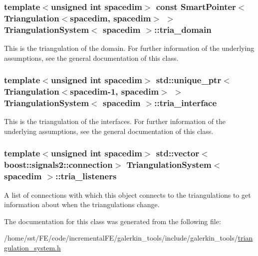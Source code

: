 \subsubsection[{\texorpdfstring{tria\+\_\+domain}{tria_domain}}]{\setlength{\rightskip}{0pt plus 5cm}template$<$unsigned int spacedim$>$ const {\bf Smart\+Pointer}$<${\bf Triangulation}$<$spacedim, spacedim$>$ $>$ {\bf Triangulation\+System}$<$ spacedim $>$\+::tria\+\_\+domain\hspace{0.3cm}{\ttfamily [protected]}}\hypertarget{class_triangulation_system_a68bafddc70652cb7c64701c74e86279f}{}\label{class_triangulation_system_a68bafddc70652cb7c64701c74e86279f}
This is the triangulation of the domain. For further information of the underlying assumptions, see the general documentation of this class. 
\subsubsection[{\texorpdfstring{tria\+\_\+interface}{tria_interface}}]{\setlength{\rightskip}{0pt plus 5cm}template$<$unsigned int spacedim$>$ std\+::unique\+\_\+ptr$<${\bf Triangulation}$<$spacedim-\/1, spacedim$>$ $>$ {\bf Triangulation\+System}$<$ spacedim $>$\+::tria\+\_\+interface\hspace{0.3cm}{\ttfamily [protected]}}\hypertarget{class_triangulation_system_af145fb3f6a3b3ef9ed92111f9fca5b7d}{}\label{class_triangulation_system_af145fb3f6a3b3ef9ed92111f9fca5b7d}
This is the triangulation of the interfaces. For further information of the underlying assumptions, see the general documentation of this class. 
\subsubsection[{\texorpdfstring{tria\+\_\+listeners}{tria_listeners}}]{\setlength{\rightskip}{0pt plus 5cm}template$<$unsigned int spacedim$>$ std\+::vector$<$boost\+::signals2\+::connection$>$ {\bf Triangulation\+System}$<$ spacedim $>$\+::tria\+\_\+listeners\hspace{0.3cm}{\ttfamily [private]}}\hypertarget{class_triangulation_system_a713f97bee5570de1f5571d86a41e83f6}{}\label{class_triangulation_system_a713f97bee5570de1f5571d86a41e83f6}
A list of connections with which this object connects to the triangulations to get information about when the triangulations change. 

The documentation for this class was generated from the following file\+:\begin{DoxyCompactItemize}
\item 
/home/sst/\+F\+E/code/incremental\+F\+E/galerkin\+\_\+tools/include/galerkin\+\_\+tools/\hyperlink{triangulation__system_8h}{triangulation\+\_\+system.\+h}\end{DoxyCompactItemize}

